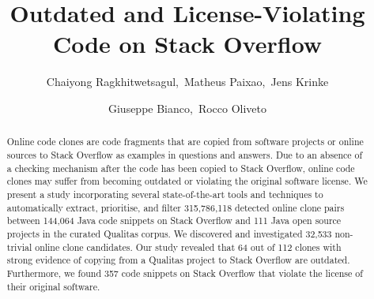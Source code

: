 \documentclass[sigconf,review, anonymous]{acmart}
\begin{document}
	\title{Outdated and License-Violating Code on Stack Overflow}
	
\author{Chaiyong Ragkhitwetsagul,~Matheus Paixao,~Jens Krinke}

\author{Giuseppe Bianco,~Rocco Oliveto}

\begin{abstract}
  Online code clones are code fragments that are copied from software
  projects or online sources to Stack Overflow as examples in
  questions and answers.
  Due to an absence of a checking mechanism after the code has been
  copied to Stack Overflow, online code clones may suffer from
  becoming outdated or violating the original software license.
  We present a study incorporating several state-of-the-art tools and
  techniques to automatically extract, prioritise, and filter
  315,786,118 detected online clone pairs between 144,064 Java code
  snippets on Stack Overflow and 111 Java open source projects in the
  curated Qualitas corpus. We discovered and investigated 32,533
  non-trivial online clone candidates. Our study revealed that 64 out
  of 112 clones with strong evidence of copying from a Qualitas
  project to Stack Overflow are outdated. Furthermore, we found 357
  code snippets on Stack Overflow that violate the license of their
  original software.
\end{abstract}
\end{document}
